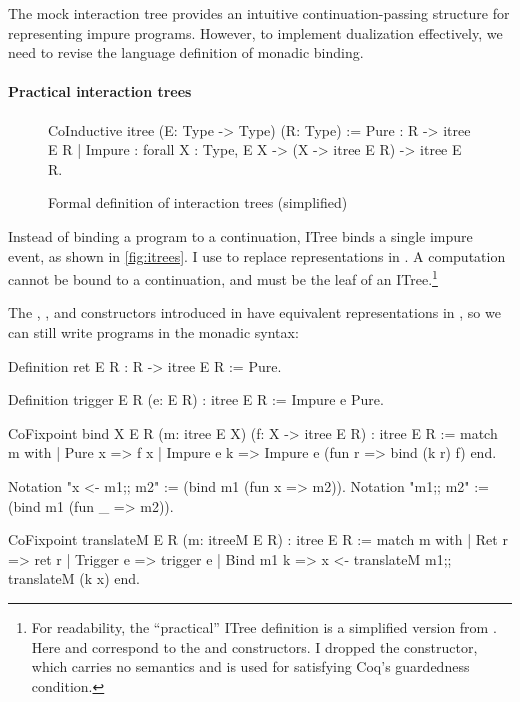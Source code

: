 The mock interaction tree provides an intuitive continuation-passing structure
for representing impure programs.  However, to implement dualization
effectively, we need to revise the language definition of monadic binding.

\paragraph{Practical interaction trees}

\begin{figure}
\begin{coq}
  CoInductive itree (E: Type -> Type) (R: Type) :=
    Pure   : R -> itree E R
  | Impure : forall {X : Type}, E X -> (X -> itree E R) -> itree E R.
\end{coq}
\caption{Formal definition of interaction trees (simplified)}
\label{fig:itrees}
\end{figure}

Instead of binding a program to a continuation, ITree binds a single impure
event, as shown in \autoref{fig:itrees}.  I use  to
replace  representations in .
A  computation cannot be bound to a continuation, and must be the leaf
of an ITree.\footnote{For readability, the ``practical'' ITree definition is a
simplified version from \citet{itree}.  Here  and 
correspond to the  and  constructors.  I dropped the  constructor, which carries no semantics and is used
for satisfying Coq's guardedness condition.}

The , , and  constructors introduced in
 have equivalent representations in , so we can still
write programs in the monadic syntax:
\begin{coq}
  Definition ret {E R} : R -> itree E R := Pure.
  
  Definition trigger {E R} (e: E R) : itree E R := Impure e Pure.

  CoFixpoint bind {X E R} (m: itree E X) (f: X -> itree E R) : itree E R :=
    match m with
    | Pure   x   => f x
    | Impure e k => Impure e (fun r => bind (k r) f)
    end.

  Notation "x <- m1;; m2" := (bind m1 (fun x => m2)).
  Notation "m1;; m2"      := (bind m1 (fun _ => m2)).

  CoFixpoint translateM {E R} (m: itreeM E R) : itree E R :=
    match m with
    | Ret     r => ret r
    | Trigger e => trigger e
    | Bind m1 k => x <- translateM m1;; translateM (k x)
    end.
\end{coq}

